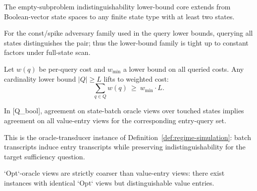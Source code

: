 \begin{proposition}\label{prop:query-finite-state-generalization}
The empty-subproblem indistinguishability lower-bound core extends from Boolean-vector state spaces to any finite state type with at least two states.
\end{proposition}

\begin{proposition}\label{prop:query-tightness-full-scan}
For the const/spike adversary family used in the query lower bounds, querying all states distinguishes the pair; thus the lower-bound family is tight up to constant factors under full-state scan.
\end{proposition}

\begin{proposition}\label{prop:query-weighted-transfer}
Let $w(q)$ be per-query cost and $w_{\min}$ a lower bound on all queried costs.
Any cardinality lower bound $|Q|\geq L$ lifts to weighted cost:
\[
\sum_{q\in Q} w(q)\ \ge\ w_{\min}\cdot L.
\]
\end{proposition}

\begin{proposition}\label{prop:oracle-lattice-transfer}
In [Q\_bool], agreement on state-batch oracle views over touched states implies agreement on all value-entry views for the corresponding entry-query set.
\end{proposition}

This is the oracle-transducer instance of Definition~\ref{def:regime-simulation}: batch transcripts induce entry transcripts while preserving indistinguishability for the target sufficiency question.

\begin{proposition}\label{prop:oracle-lattice-strict}
`Opt`-oracle views are strictly coarser than value-entry views: there exist instances with identical `Opt` views but distinguishable value entries.
\end{proposition}


